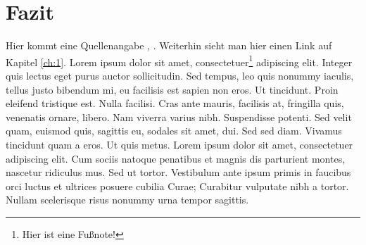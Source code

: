 \chapter{Fazit}

Hier kommt eine Quellenangabe \cite{Gray1981}, \cite{docker:daemon}. Weiterhin sieht man hier einen Link auf Kapitel \ref{ch:1}.
Lorem ipsum dolor sit amet, consectetuer\footnote{Hier ist eine Fußnote!} adipiscing elit. Integer quis lectus eget purus auctor sollicitudin.
Sed tempus, leo quis nonummy iaculis, tellus justo bibendum mi, eu facilisis est sapien non eros. Ut tincidunt. Proin eleifend tristique est.
Nulla facilisi. Cras ante mauris, facilisis at, fringilla quis, venenatis ornare, libero. Nam viverra varius nibh. Suspendisse potenti.
Sed velit quam, euismod quis, sagittis eu, sodales sit amet, dui. Sed sed diam. Vivamus tincidunt quam a eros. Ut quis metus.
Lorem ipsum dolor sit amet, consectetuer adipiscing elit. Cum sociis natoque penatibus et magnis dis parturient montes, nascetur ridiculus mus.
Sed ut tortor. Vestibulum ante ipsum primis in faucibus orci luctus et ultrices posuere cubilia Curae; Curabitur vulputate nibh a tortor.
Nullam scelerisque risus nonummy urna tempor sagittis.
